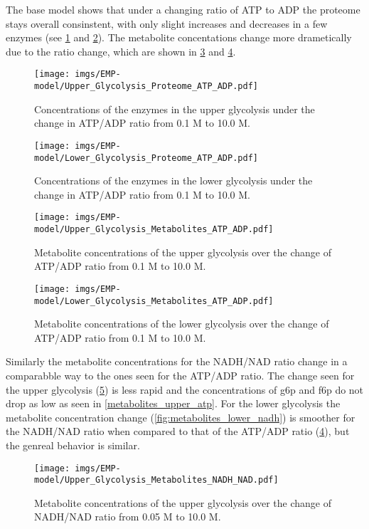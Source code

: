 The base model shows that under a changing ratio of ATP to ADP the proteome stays overall consinstent, with only slight increases and decreases in a few enzymes (see \ref{fig:proteome_upper_atp} and \ref{fig:proteome_lower_atp}). The metabolite concentations change more drametically due to the ratio change, which are shown in \ref{fig:metabolites_upper_atp} and \ref{fig:metabolites_lower_atp}. 
\begin{figure}[H]
    \centering
    \texttt{[image: imgs/EMP-model/Upper\_Glycolysis\_Proteome\_ATP\_ADP.pdf]}
    \caption{Concentrations of the enzymes in the upper glycolysis under the change in ATP/ADP ratio from 0.1 M to 10.0 M.}
    \label{fig:proteome_upper_atp}
\end{figure}

\begin{figure}[H]
    \centering
    \texttt{[image: imgs/EMP-model/Lower\_Glycolysis\_Proteome\_ATP\_ADP.pdf]}
    \caption{Concentrations of the enzymes in the lower glycolysis under the change in ATP/ADP ratio from 0.1 M to 10.0 M.}
    \label{fig:proteome_lower_atp}
\end{figure}

\begin{figure}[H]
    \centering
    \texttt{[image: imgs/EMP-model/Upper\_Glycolysis\_Metabolites\_ATP\_ADP.pdf]}
    \caption{Metabolite concentrations of the upper glycolysis over the change of ATP/ADP ratio from 0.1 M to 10.0 M.}
    \label{fig:metabolites_upper_atp}
\end{figure}

\begin{figure}[H]
    \centering
    \texttt{[image: imgs/EMP-model/Lower\_Glycolysis\_Metabolites\_ATP\_ADP.pdf]}
    \caption{Metabolite concentrations of the lower glycolysis over the change of ATP/ADP ratio from 0.1 M to 10.0 M.}
    \label{fig:metabolites_lower_atp}
\end{figure}

Similarly the metabolite concentrations for the NADH/NAD ratio change in a comparabble way to the ones seen for the ATP/ADP ratio. The change seen for the upper glycolysis (\ref{fig:metabolites_upper_nadh}) is less rapid and the concentrations of g6p and f6p do not drop as low as seen in \ref{metabolites_upper_atp}. For the lower glycolysis the metabolite concentration change (\ref{fig:metabolites_lower_nadh}) is smoother for the NADH/NAD ratio when compared to that of the ATP/ADP ratio (\ref{fig:metabolites_lower_atp}), but the genreal behavior is similar.
\begin{figure}[H]
    \centering
    \texttt{[image: imgs/EMP-model/Upper\_Glycolysis\_Metabolites\_NADH\_NAD.pdf]}
    \caption{Metabolite concentrations of the upper glycolysis over the change of NADH/NAD ratio from 0.05 M to 10.0 M.}
    \label{fig:metabolites_upper_nadh}
\end{figure}

